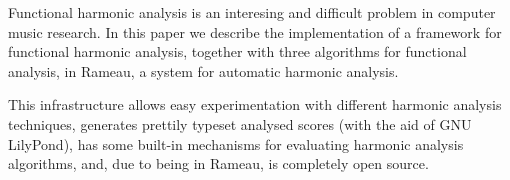 Functional harmonic analysis is an interesing and difficult problem in
computer music research. In this paper we describe the implementation
of a framework for functional harmonic analysis, together with three
algorithms for functional analysis, in Rameau, a system for automatic
harmonic analysis.

This infrastructure allows easy experimentation with different
harmonic analysis techniques, generates prettily typeset analysed
scores (with the aid of GNU LilyPond), has some built-in mechanisms
for evaluating harmonic analysis algorithms, and, due to being in
Rameau, is completely open source.

